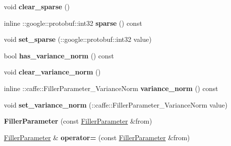 \begin{DoxyCompactItemize}
void {\bfseries clear\+\_\+sparse} ()
\item 
\mbox{\label{classcaffe_1_1_filler_parameter_a833b0b8d41fec6d43f81e35a25d51329}} 
inline \+::google\+::protobuf\+::int32 {\bfseries sparse} () const
\item 
\mbox{\label{classcaffe_1_1_filler_parameter_a9ba27cb1cda0c5eaae334b861ef30e54}} 
void {\bfseries set\+\_\+sparse} (\+::google\+::protobuf\+::int32 value)
\item 
\mbox{\label{classcaffe_1_1_filler_parameter_ab8e11c82a064f4866450f530d4b8f054}} 
bool {\bfseries has\+\_\+variance\+\_\+norm} () const
\item 
\mbox{\label{classcaffe_1_1_filler_parameter_af2fe9fefa337c81a549548822c204303}} 
void {\bfseries clear\+\_\+variance\+\_\+norm} ()
\item 
\mbox{\label{classcaffe_1_1_filler_parameter_afcec8b299600ec6fb4ad59395df35740}} 
inline \+::caffe\+::\+Filler\+Parameter\+\_\+\+Variance\+Norm {\bfseries variance\+\_\+norm} () const
\item 
\mbox{\label{classcaffe_1_1_filler_parameter_a2655457218dabb0adb9734b2503031d6}} 
void {\bfseries set\+\_\+variance\+\_\+norm} (\+::caffe\+::\+Filler\+Parameter\+\_\+\+Variance\+Norm value)
\item 
\mbox{\label{classcaffe_1_1_filler_parameter_af4c67d2b32cbd3167c4cd83f1a9de275}} 
{\bfseries Filler\+Parameter} (const \mbox{\hyperlink{classcaffe_1_1_filler_parameter}{Filler\+Parameter}} \&from)
\item 
\mbox{\label{classcaffe_1_1_filler_parameter_ab6f8287b296e074ed4a826c0527a7b39}} 
\mbox{\hyperlink{classcaffe_1_1_filler_parameter}{Filler\+Parameter}} \& {\bfseries operator=} (const \mbox{\hyperlink{classcaffe_1_1_filler_parameter}{Filler\+Parameter}} \&from)
\item 
\mbox{\label{classcaffe_1_1_filler_parameter_aa7111cb18c8170ecac2b675c6c6e65c9}} 

\end{DoxyCompactItemize}
